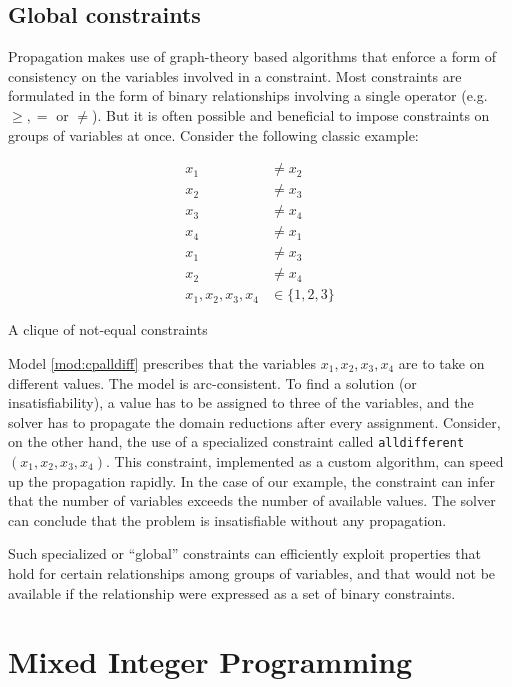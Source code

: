\documentclass[13pt, letterpaper, oneside]{book}
\begin{document}
\subsection{Global constraints}
Propagation makes use of graph-theory based algorithms that enforce a form of
consistency on the variables involved in a constraint. Most constraints are
formulated in the form of binary relationships involving a single operator (e.g.
$\geq, =$ or $\neq$). But it is often possible and beneficial to impose
constraints on groups of variables at once. Consider the following classic
example:
\begin{model}[h!]
\begin{align}
x_1 &\neq x_2\\
x_2 &\neq x_3\\
x_3 &\neq x_4\\
x_4 &\neq x_1\\
x_1 &\neq x_3\\
x_2 &\neq x_4\\
x_1, x_2, x_3, x_4 &\in \{1, 2, 3\}
\end{align}
\caption{A clique of not-equal constraints}
\label{mod:cpalldiff}
\end{model}
Model \ref{mod:cpalldiff} prescribes that the variables $x_1, x_2, x_3, x_4$ are
to take on different values. The model is arc-consistent. To find a solution (or
insatisfiability), a value has to be assigned to three of the variables, and the
solver has to propagate the domain reductions after every assignment. Consider,
on the other hand, the use of a specialized constraint called
\texttt{alldifferent}$(x_1, x_2, x_3, x_4)$. This constraint, implemented as a
custom algorithm, can speed up the propagation rapidly. In the case of our
example, the constraint can infer that the number of variables exceeds the
number of available values. The solver can conclude that the problem is
insatisfiable without any propagation.

Such specialized or ``global'' constraints can efficiently exploit properties
that hold for certain relationships among groups of variables, and that would
not be available if the relationship were expressed as a set of binary
constraints.
 
\section{Mixed Integer Programming}
\label{sec:backgroundmip}
\end{document}
